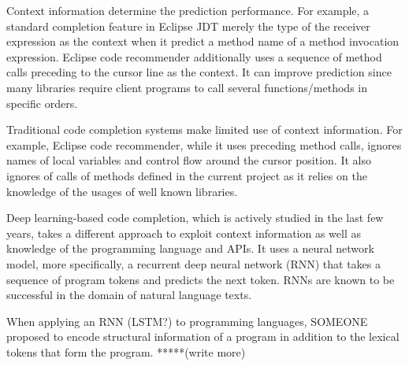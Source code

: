 \documentclass[E]{compsoft}
\begin{document}
Context information determine the prediction performance.  For example, a standard completion feature in Eclipse JDT merely the type of the receiver expression as the context when it predict a method name of a method invocation expression.  Eclipse code recommender \cite{heinemann2011suite} additionally uses a sequence of method calls preceding to the cursor line as the context.  It can improve prediction 
since many libraries require client programs to call several functions/methods in specific orders.

Traditional code completion systems make limited use of context information.  For example, Eclipse code recommender, while it uses preceding method calls, ignores names of local variables and control flow around the cursor position.  It also ignores of calls of methods defined in the current project as it relies on the knowledge of the usages of well known libraries.


Deep learning-based code completion, which is actively studied in the last few years, takes a different approach to exploit context information as well as knowledge of the programming language and APIs.  
It uses a neural network model, more specifically, a recurrent deep neural network (RNN) that takes a sequence of program tokens and predicts the next token.  RNNs are known to be successful in the domain of natural language texts. 

When applying an RNN (LSTM?) to programming languages, SOMEONE proposed to encode structural information of a program in addition to the lexical tokens that form the program.  *****(write more)
\end{document}
